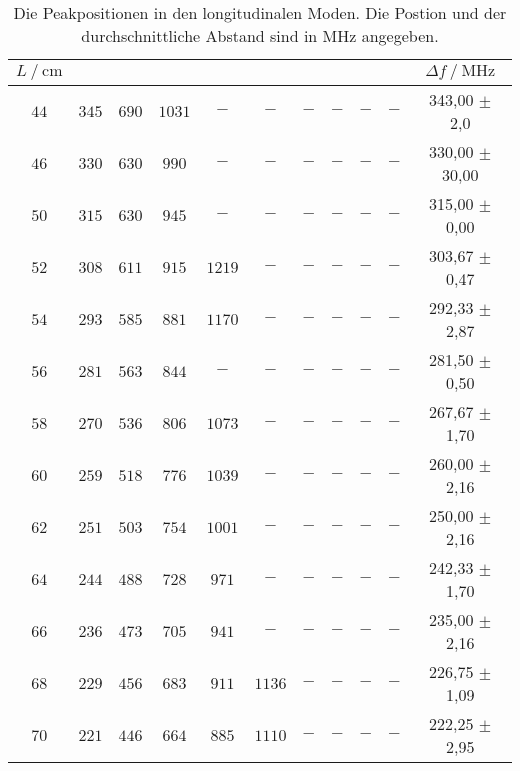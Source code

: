 \begin{table}[H]
    \centering
    \caption{Die Peakpositionen in den longitudinalen Moden. Die Postion und der durchschnittliche Abstand sind in $\unit{\mega\hertz}$ angegeben.}
    \label{tab:longi}
    \begin{tabular}{c c c c c c c c c c | S[table-format=3.2]}
    \toprule
      $L \mathbin{/} \unit{\centi\meter}$ & & & & & & & & & & $\Delta f \mathbin{/}  \unit{\mega\hertz}$   \\
    \midrule
        $44$ &  $345$ & $690$ &$ 1031$ & $-   $ & $-    $ & $-   $ & $-   $ & $-   $ &  $-   $ &   {343,00 $\pm$ 2,0}  \\
        $46$ &  $330$ & $630$ &$ 990$  & $-   $ & $-    $ & $-   $ & $-   $ & $-   $ &  $-   $ &   {330,00 $\pm$ 30,00} \\
        $50$ &  $315$ & $630$ &$ 945$  & $-   $ & $-    $ & $-   $ & $-   $ & $-   $ &  $-   $ &   {315,00 $\pm$ 0,00}  \\
        $52$ &  $308$ & $611$ &$ 915$  & $1219$ & $-    $ & $-   $ & $-   $ & $-   $ &  $-   $ &   {303,67 $\pm$ 0,47}  \\
        $54$ &  $293$ & $585$ &$ 881$  & $1170$ & $-    $ & $-   $ & $-   $ & $-   $ &  $-   $ &   {292,33 $\pm$ 2,87}  \\
        $56$ &  $281$ & $563$ &$ 844$  & $-   $ & $-    $ & $-   $ & $-   $ & $-   $ &  $-   $ &   {281,50 $\pm$ 0,50}  \\
        $58$ &  $270$ & $536$ &$ 806$  & $1073$ & $-    $ & $-   $ & $-   $ & $-   $ &  $-   $ &   {267,67 $\pm$ 1,70}  \\
        $60$ &  $259$ & $518$ &$ 776$  & $1039$ & $-    $ & $-   $ & $-   $ & $-   $ &  $-   $ &   {260,00 $\pm$ 2,16}  \\
        $62$ &  $251$ & $503$ &$ 754$  & $1001$ & $-    $ & $-   $ & $-   $ & $-   $ &  $-   $ &   {250,00 $\pm$ 2,16}  \\
        $64$ &  $244$ & $488$ &$ 728$  & $971 $ & $-    $ & $-   $ & $-   $ & $-   $ &  $-   $ &   {242,33 $\pm$ 1,70}  \\
        $66$ &  $236$ & $473$ &$ 705$  & $941 $ & $-    $ & $-   $ & $-   $ & $-   $ &  $-   $ &   {235,00 $\pm$ 2,16}  \\
        $68$ &  $229$ & $456$ &$ 683$  & $911 $ & $1136 $ & $-   $ & $-   $ & $-   $ &  $-   $ &   {226,75 $\pm$ 1,09}  \\
        $70$ &  $221$ & $446$ &$ 664$  & $885 $ & $1110 $ & $-   $ & $-   $ & $-   $ &  $-   $ &   {222,25 $\pm$ 2,95}  \\

\end{tabular}
\end{table}
